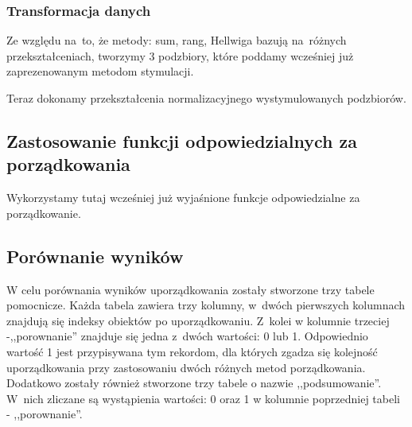 \documentclass[12pt,a4paper]{report}
\begin{document}
{\subsubsection{Transformacja danych}
Ze względu na~to, że metody: sum, rang, Hellwiga bazują na~różnych przekształceniach, tworzymy 3 podzbiory, które poddamy wcześniej już zaprezenowanym metodom stymulacji. 
\begin{Shaded}
\begin{Highlighting}[]
\NormalTok{)}
\NormalTok{)}
\NormalTok{)}
\end{Highlighting}
\end{Shaded}
Teraz dokonamy przekształcenia normalizacyjnego wystymulowanych
podzbiorów.
\begin{Shaded}
\begin{Highlighting}[]
\end{Highlighting}
\end{Shaded}

\subsection{Zastosowanie funkcji odpowiedzialnych za porządkowania}
Wykorzystamy tutaj wcześniej już wyjaśnione funkcje odpowiedzialne za porządkowanie. 

\begin{Shaded}
\begin{Highlighting}[]
\end{Highlighting}
\end{Shaded}
\subsection{Porównanie wyników}\label{porownanie-3metody}
W celu porównania wyników uporządkowania zostały stworzone trzy tabele
pomocnicze. Każda tabela zawiera trzy kolumny, w~dwóch pierwszych
kolumnach znajdują się indeksy obiektów po uporządkowaniu. Z~kolei w
kolumnie trzeciej -,,porownanie'' znajduje się jedna z~dwóch wartości: 0
lub 1. Odpowiednio wartość 1 jest przypisywana tym rekordom, dla których
zgadza się kolejność uporządkowania przy zastosowaniu dwóch różnych
metod porządkowania. Dodatkowo zostały również stworzone trzy tabele o
nazwie ,,podsumowanie''. W~nich zliczane są wystąpienia wartości: 0 oraz 1 
w kolumnie poprzedniej tabeli - ,,porownanie''.
}
\end{document}
